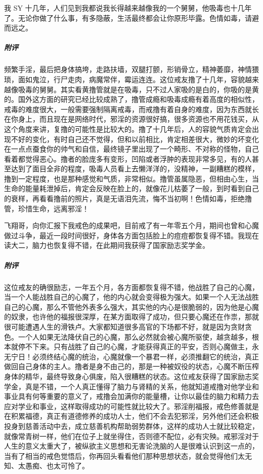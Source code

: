 \begin{case}
    我 SY 十几年，人们见到我都说我长得越来越像我的一个舅舅，他吸毒也十几年了。无论你做了什么事，有多隐蔽，生活最终都会让你原形毕露。色情如毒，请避而远之。
    \subparagraph{附评} 频繁手淫，最后把身体搞垮，走路扶墙，双腿打颤，形销骨立，精神萎靡，神情猥琐，面如鬼泣，行尸走肉，病魔常伴，霉运连连。这位戒友撸了十几年，容貌越来越像吸毒的舅舅。其实看黄撸管就是在吸毒，只不过人家吸的是白的，你吸的是黄的。国外这方面的研究已经比较成熟了，撸管成瘾和吸毒成瘾有着高度的相似性，戒毒的难度很大，一般需要强制隔离戒毒，而戒撸有着自身的难度，因为东西就长在你身上，而且现在是网络时代，邪淫的资源很好搞，很多资源也不用花钱买，从这个角度来讲，复撸的可能性是比较大的。撸了十几年后，人的容貌气质肯定会出现不好的变化，有时自己还不觉得，但和以前相比，肯定相差很大，微妙的坏变化在一点点蚕食你的帅气和自信，最终镜子里出现了一个畸形、不对称的怪物，自己看着都觉得恶心。撸者的脸庞多有变形，凹陷或者浮肿的表现非常多见，有的人甚至达到了面目全非的程度，吸毒人员看上去懒洋洋的，没精神，一副糟糕的模样，撸到一定程度，也是那种感觉和气质，非常相似。撸管虽属隐恶，但相由心生，当生命的能量耗泄掉后，肯定会反映在脸上的，就像花儿枯萎了一般，到时看到自己的衰样，再看看撸前的照片，真是无语泪先流，悔不当初啊！色情如毒，拒绝撸管，珍惜生命，远离邪淫！
\end{case}

\begin{case}
    飞翔哥，向你汇报下我戒色的成果吧，目前戒了有一年零五个月，期间也曾和心魔做过斗争，最近一段时间很好，身体各方面包括脸上的痘痘都恢复得不错。我现在读大二，脑力也恢复得不错，在此期间我获得了国家励志奖学金。
    \subparagraph{附评} 这位戒友的确很励志，一年五个月，各方面都恢复得不错，他战胜了自己的心魔，当一个人能战胜自己的心魔了，他的内心就会变得极为强大。如果一个人无法战胜自己的心魔，那么不管他外表多么强大，其实他的内心是很脆弱的，因为他是心魔的奴隶，也许他的福报很深厚，在某方面取得了成功，但只要心魔还在作祟，那就很可能遭遇人生的滑铁卢。大家都知道很多高官的下场都不好，就是因为贪财贪色。一个人如果无法降伏自己的心魔，那么必然就会被心魔所驱使，越贪越多，根本就停不下来。只有战胜了自己的心魔，才能获得真正的平安，否则心魔做主，永无宁日！必须终结心魔的统治，心魔就像一个暴君一样，必须推翻它的统治，真正做回自己身体的主人。撸者是身不由己的，那是一种被奴役的状态，心魔不断压榨身体的精华，最终导致身心俱废，陷入很糟糕的状态。这位戒友获得了国家励志奖学金，真是不错，一个人真正懂得了脑力与肾精的关系，他就知道戒撸对他学业和事业具有何等重要的意义了，戒撸会加满你的能量槽，让你以最佳的脑力和精力去应对学业和事业，这样取得成功的可能性就比较大了。邪淫削福报，戒色修善就是在积累福德，真正有道德修养的成功人士，他们不会去犯邪淫，另外他们还会积极投身到慈善活动中去，成立慈善机构帮助弱势群体，这样的成功人士就比较稳定，就像常青树一样，他们在位子上就坐得住，否则德不配位，必有灾殃。戒邪淫对于人生的意义太重大了，被纵欲主义思想和无害论洗脑的人是很难认识到这一点的，当有了相当的戒色觉悟后，你再回头看看他们那种思想状态，就会觉得他们太无知、太愚痴、也太可怜了。
\end{case}

